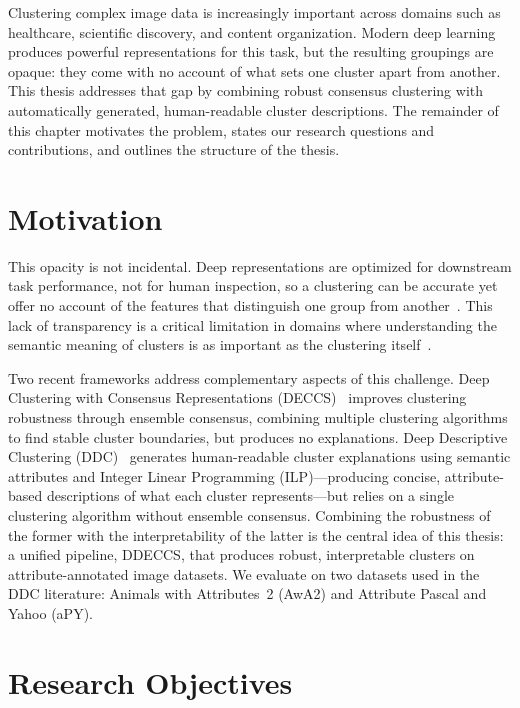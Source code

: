 Clustering complex image data is increasingly important across domains such as healthcare, scientific discovery, and content organization. Modern deep learning produces powerful representations for this task, but the resulting groupings are opaque: they come with no account of what sets one cluster apart from another. This thesis addresses that gap by combining robust consensus clustering with automatically generated, human-readable cluster descriptions. The remainder of this chapter motivates the problem, states our research questions and contributions, and outlines the structure of the thesis.

\section{Motivation}

This opacity is not incidental. Deep representations are optimized for downstream task performance, not for human inspection, so a clustering can be accurate yet offer no account of the features that distinguish one group from another~\citep{LeCun2015, Ren2024}. This lack of transparency is a critical limitation in domains where understanding the semantic meaning of clusters is as important as the clustering itself~\citep{Guidotti2018}.

Two recent frameworks address complementary aspects of this challenge. Deep Clustering with Consensus Representations (DECCS)~\citep{Miklautz2022} improves clustering robustness through ensemble consensus, combining multiple clustering algorithms to find stable cluster boundaries, but produces no explanations. Deep Descriptive Clustering (DDC)~\citep{Zhang2021} generates human-readable cluster explanations using semantic attributes and Integer Linear Programming (ILP)---producing concise, attribute-based descriptions of what each cluster represents---but relies on a single clustering algorithm without ensemble consensus. Combining the robustness of the former with the interpretability of the latter is the central idea of this thesis: a unified pipeline, DDECCS, that produces robust, interpretable clusters on attribute-annotated image datasets. We evaluate on two datasets used in the DDC literature: Animals with Attributes~2 (AwA2) and Attribute Pascal and Yahoo (aPY).

\section{Research Objectives}

